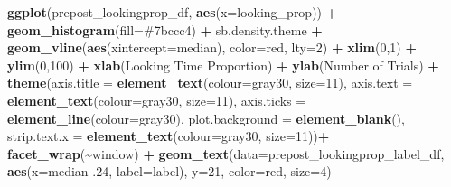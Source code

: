 \documentclass[
  doc,floatsintext]{apa6}
\newenvironment{Shaded}{\begin{snugshade}}{\end{snugshade}}
\newcommand{\AttributeTok}[1]{\textcolor[rgb]{0.13,0.29,0.53}{#1}}
\newcommand{\DecValTok}[1]{\textcolor[rgb]{0.00,0.00,0.81}{#1}}
\newcommand{\FloatTok}[1]{\textcolor[rgb]{0.00,0.00,0.81}{#1}}
\newcommand{\FunctionTok}[1]{\textcolor[rgb]{0.13,0.29,0.53}{\textbf{#1}}}
\newcommand{\NormalTok}[1]{#1}
\newcommand{\SpecialCharTok}[1]{\textcolor[rgb]{0.81,0.36,0.00}{\textbf{#1}}}
\newcommand{\StringTok}[1]{\textcolor[rgb]{0.31,0.60,0.02}{#1}}
\begin{document}
\begin{Shaded}
\begin{Highlighting}[]
\FunctionTok{ggplot}\NormalTok{(prepost\_lookingprop\_df, }\FunctionTok{aes}\NormalTok{(}\AttributeTok{x=}\NormalTok{looking\_prop)) }\SpecialCharTok{+}
  \FunctionTok{geom\_histogram}\NormalTok{(}\AttributeTok{fill=}\StringTok{\textquotesingle{}\#7bccc4\textquotesingle{}}\NormalTok{) }\SpecialCharTok{+}
\NormalTok{  sb.density.theme }\SpecialCharTok{+}
  \FunctionTok{geom\_vline}\NormalTok{(}\FunctionTok{aes}\NormalTok{(}\AttributeTok{xintercept=}\NormalTok{median), }\AttributeTok{color=}\StringTok{\textquotesingle{}red\textquotesingle{}}\NormalTok{, }\AttributeTok{lty=}\DecValTok{2}\NormalTok{) }\SpecialCharTok{+}
  \FunctionTok{xlim}\NormalTok{(}\DecValTok{0}\NormalTok{,}\DecValTok{1}\NormalTok{) }\SpecialCharTok{+}
  \FunctionTok{ylim}\NormalTok{(}\DecValTok{0}\NormalTok{,}\DecValTok{100}\NormalTok{) }\SpecialCharTok{+}
  \FunctionTok{xlab}\NormalTok{(}\StringTok{\textquotesingle{}Looking Time Proportion\textquotesingle{}}\NormalTok{) }\SpecialCharTok{+}
  \FunctionTok{ylab}\NormalTok{(}\StringTok{\textquotesingle{}Number of Trials\textquotesingle{}}\NormalTok{) }\SpecialCharTok{+} 
  \FunctionTok{theme}\NormalTok{(}\AttributeTok{axis.title =} \FunctionTok{element\_text}\NormalTok{(}\AttributeTok{colour=}\StringTok{\textquotesingle{}gray30\textquotesingle{}}\NormalTok{, }\AttributeTok{size=}\DecValTok{11}\NormalTok{),}
        \AttributeTok{axis.text =} \FunctionTok{element\_text}\NormalTok{(}\AttributeTok{colour=}\StringTok{\textquotesingle{}gray30\textquotesingle{}}\NormalTok{, }\AttributeTok{size=}\DecValTok{11}\NormalTok{),}
        \AttributeTok{axis.ticks =} \FunctionTok{element\_line}\NormalTok{(}\AttributeTok{colour=}\StringTok{\textquotesingle{}gray30\textquotesingle{}}\NormalTok{),}
        \AttributeTok{plot.background =} \FunctionTok{element\_blank}\NormalTok{(),}
        \AttributeTok{strip.text.x =} \FunctionTok{element\_text}\NormalTok{(}\AttributeTok{colour=}\StringTok{\textquotesingle{}gray30\textquotesingle{}}\NormalTok{, }\AttributeTok{size=}\DecValTok{11}\NormalTok{))}\SpecialCharTok{+}
  \FunctionTok{facet\_wrap}\NormalTok{(}\SpecialCharTok{\textasciitilde{}}\NormalTok{window) }\SpecialCharTok{+}
  \FunctionTok{geom\_text}\NormalTok{(}\AttributeTok{data=}\NormalTok{prepost\_lookingprop\_label\_df,}
            \FunctionTok{aes}\NormalTok{(}\AttributeTok{x=}\NormalTok{median}\FloatTok{{-}.24}\NormalTok{, }\AttributeTok{label=}\NormalTok{label), }\AttributeTok{y=}\DecValTok{21}\NormalTok{, }
            \AttributeTok{color=}\StringTok{\textquotesingle{}red\textquotesingle{}}\NormalTok{, }\AttributeTok{size=}\DecValTok{4}\NormalTok{)}
\end{Highlighting}
\end{Shaded}
\end{document}
